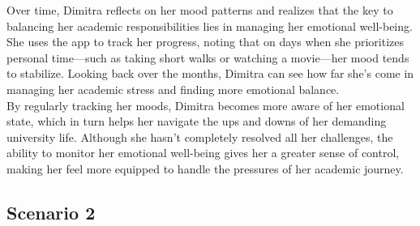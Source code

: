 Over time, Dimitra reflects on her mood patterns and realizes that the key to balancing her academic responsibilities lies in managing her emotional well-being. She uses the app to track her progress, noting that on days when she prioritizes personal time—such as taking short walks or watching a movie—her mood tends to stabilize. Looking back over the months, Dimitra can see how far she’s come in managing her academic stress and finding more emotional balance.\vspace{5mm} \\
By regularly tracking her moods, Dimitra becomes more aware of her emotional state, which in turn helps her navigate the ups and downs of her demanding university life. Although she hasn't completely resolved all her challenges, the ability to monitor her emotional well-being gives her a greater sense of control, making her feel more equipped to handle the pressures of her academic journey.

\subsection{Scenario 2}

